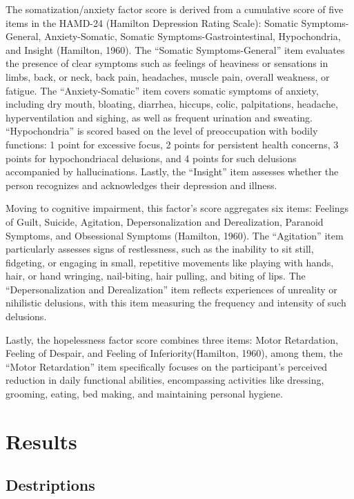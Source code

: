 \documentclass[
  man,floatsintext]{apa6}
\begin{document}
The somatization/anxiety factor score is derived from a cumulative score of five items in the HAMD-24 (Hamilton Depression Rating Scale): Somatic Symptoms-General, Anxiety-Somatic, Somatic Symptoms-Gastrointestinal, Hypochondria, and Insight (Hamilton, 1960). The ``Somatic Symptoms-General'' item evaluates the presence of clear symptoms such as feelings of heaviness or sensations in limbs, back, or neck, back pain, headaches, muscle pain, overall weakness, or fatigue. The ``Anxiety-Somatic'' item covers somatic symptoms of anxiety, including dry mouth, bloating, diarrhea, hiccups, colic, palpitations, headache, hyperventilation and sighing, as well as frequent urination and sweating. ``Hypochondria'' is scored based on the level of preoccupation with bodily functions: 1 point for excessive focus, 2 points for persistent health concerns, 3 points for hypochondriacal delusions, and 4 points for such delusions accompanied by hallucinations. Lastly, the ``Insight'' item assesses whether the person recognizes and acknowledges their depression and illness.

Moving to cognitive impairment, this factor's score aggregates six items: Feelings of Guilt, Suicide, Agitation, Depersonalization and Derealization, Paranoid Symptoms, and Obsessional Symptoms (Hamilton, 1960). The ``Agitation'' item particularly assesses signs of restlessness, such as the inability to sit still, fidgeting, or engaging in small, repetitive movements like playing with hands, hair, or hand wringing, nail-biting, hair pulling, and biting of lips. The ``Depersonalization and Derealization'' item reflects experiences of unreality or nihilistic delusions, with this item measuring the frequency and intensity of such delusions.

Lastly, the hopelessness factor score combines three items: Motor Retardation, Feeling of Despair, and Feeling of Inferiority(Hamilton, 1960), among them, the ``Motor Retardation'' item specifically focuses on the participant's perceived reduction in daily functional abilities, encompassing activities like dressing, grooming, eating, bed making, and maintaining personal hygiene.

\hypertarget{results}{%
\section{Results}\label{results}}

\hypertarget{destriptions}{%
\subsection{Destriptions}\label{destriptions}}
\end{document}
